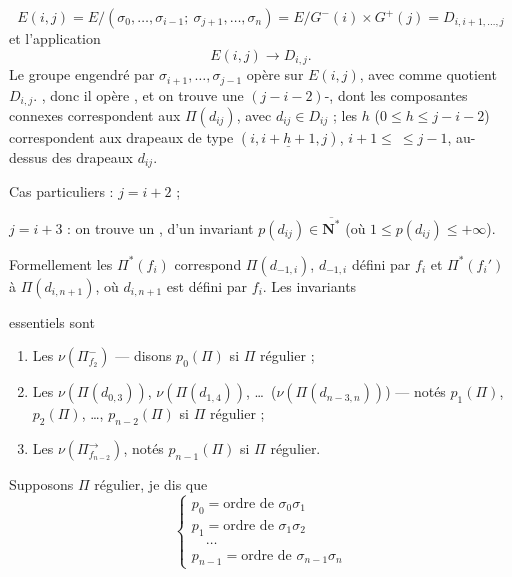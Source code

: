\documentclass[11pt,a4paper]{article}
\begin{document}
\[
E(i,j) = E/(\sigma_0,\dots,\sigma_{i-1};\ \sigma_{j+1},\dots,\sigma_n) = E/G^{-}(i)\times G^{+}(j) = D_{i,i+1,\dots,j}
\]
et l'application
\[
E(i,j) \longrightarrow D_{i,j} .
\]
\struck{\ill{}} 
Le groupe engendré par $\sigma_{i+1},\dots,\sigma_{j-1}$ opère sur $E(i,j)$, avec comme quotient $D_{i,j}$. \ill{}, donc il opère , et on trouve une $(j-i-2)$-\ill{}, dont les composantes connexes correspondent aux $\Pi(d_{ij})$, avec $d_{ij}\in D_{ij}$ ; les  $h$ ($0\leq h\leq j-i-2$) correspondent aux drapeaux de type $(i,\underline{i+h+1},j)$, $i+1\leq\ \leq j-1$, au-dessus des drapeaux $d_{ij}$.

Cas particuliers : $j=i+2$  ;

$j=i+3$ : on trouve un , d'un invariant $p(d_{ij})\in\overline{\mathbf{N}^{*}}$ (où $1\leq p(d_{ij})\leq+\infty$).

  Formellement les $\Pi^{*}(f_i)$ correspond \struck{\ill{}} \struck{\ill{}} $\Pi(d_{-1,i})$, $d_{-1,i}$ défini par $f_i$ \struck{(\ill{})}
 et $\Pi^{*}(f_i')$ \ill{} à $\Pi(d_{i,n+1})$, où $d_{i,n+1}$ est défini par $f_i$. Les invariants 

essentiels sont
\begin{enumerate}
\item[a)] Les $\nu(\Pi^{-}_{f_2})$ --- disons $p_0(\Pi)$ si $\Pi$ régulier ;
\item[b)] Les $\nu(\Pi(d_{0,3}))$, $\nu(\Pi(d_{1,4}))$, \ldots\ ($\nu(\Pi(d_{n-3,n}))$) --- notés $p_1(\Pi)$, $p_2(\Pi)$, \ldots, $p_{n-2}(\Pi)$ si $\Pi$ régulier ;
\item[c)] Les $\nu(\Pi^{\rightarrow}_{f_{n-2}})$, \struck{\ill{}} notés $p_{n-1}(\Pi)$ si $\Pi$ régulier.
\end{enumerate}

Supposons $\Pi$ régulier, je dis que
\[
\begin{cases}
p_0 = \text{ordre de } \sigma_0\sigma_1\\
p_1 = \text{ordre de } \sigma_1\sigma_2\\
\quad\dots\\
p_{n-1} = \text{ordre de } \sigma_{n-1}\sigma_n
\end{cases}
\]
\end{document}
